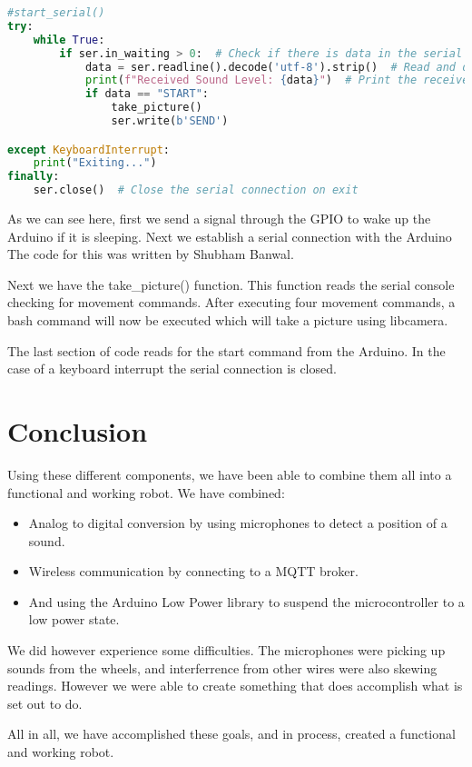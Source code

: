 \documentclass[12pt,a4paper]{article}
\begin{document}
\begin{lstlisting}[language=Python, caption=Rasperry Pi Code]
#start_serial()
try:
    while True:
        if ser.in_waiting > 0:  # Check if there is data in the serial buffer
            data = ser.readline().decode('utf-8').strip()  # Read and decode the data
            print(f"Received Sound Level: {data}")  # Print the received data
            if data == "START":
                take_picture()
                ser.write(b'SEND')

except KeyboardInterrupt:
    print("Exiting...")
finally:
    ser.close()  # Close the serial connection on exit

\end{lstlisting}

As we can see here, first we send a signal through the GPIO to wake up the Arduino if it is sleeping.
Next we establish a serial connection with the Arduino
The code for this was written by Shubham Banwal.

Next we have the take_picture() function. This function reads the serial console checking for movement commands.
After executing four movement commands, a bash command will now be executed which will take a picture using libcamera.

The last section of code reads for the start command from the Arduino. In the case of a keyboard interrupt the serial connection is closed.

\section{Conclusion}

Using these different components, we have been able to combine them all into a functional and working robot.
We have combined:
\begin{itemize}
    \item Analog to digital conversion by using microphones to detect a position of a sound.
    \item Wireless communication by connecting to a MQTT broker.
    \item And using the Arduino Low Power library to suspend the microcontroller to a low power state.
\end{itemize}

We did however experience some difficulties. The microphones were picking up sounds from the wheels, and interferrence from other wires were also skewing readings. However we were able to create something that does accomplish what is set out to do.

All in all, we have accomplished these goals, and in process, created a functional and working robot.




\end{document}
